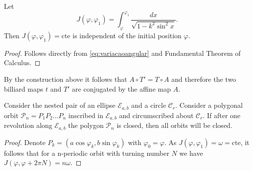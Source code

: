  \begin{proposition} Let 
 \[J(\varphi,\varphi_1)=\int_{\varphi}^{\varphi_1}\frac{dx}{\sqrt{1-k^2\sin^2x}}.\]
 Then $J(\varphi,\varphi_1) =\text{cte}$ is independent of the initial position $\varphi.$
     
 \end{proposition}
 
 \begin{proof} Follows directly from   \cref{eq:variacaoangular} and Fundamental Theorem of Calculus.
 \end{proof}
 \begin{remark} By the construction above it follows that
$A\circ T'=T\circ A$ and therefore the two billiard maps $t$ and $T'$ are conjugated by the affine map $A$.
\end{remark}
 
    \begin{theorem} [Poncelet] Consider the nested pair of an ellipse $ \mathcal{E}_{a,b}$ and a circle $\mathcal{C}_r$. Consider a polygonal orbit $\mathcal{P}_n=P_1P_2\ldots P_n$ inscribed in $\mathcal{E}_{a,b}$ and circumscribed about $\mathcal{C}_r$. If after one revolution along $ \mathcal{E}_{a,b}$ the polygon $\mathcal{P}_n$ is closed, then all orbits will be closed.
    
\end{theorem}

\begin{proof} Denote $P_k=(a\cos\varphi_k,b\sin\varphi_k)$ with $\varphi_0=\varphi.$ As $J(\varphi,\varphi_1)=\omega=\text{cte}$, it follows that for a n-periodic orbit with turning number $N$ we have
$J(\varphi,\varphi+2\pi N)= n\omega$. 
\end{proof}

